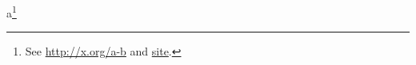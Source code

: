 \documentclass{article}
\begin{document}
a\footnote{See \url{http://x.org/a-b} and \href{http://x.org/c-d}{site}.}
\end{document}
